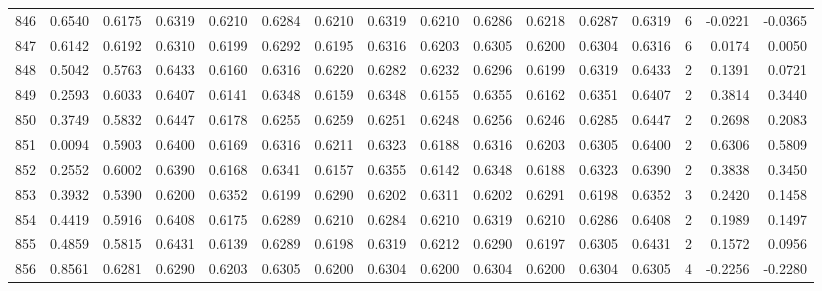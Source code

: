 \begin{tabular}{lrrrrrrrrrrrrrrr}
846 &      0.6540 &  0.6175 &  0.6319 &  0.6210 &  0.6284 &  0.6210 &  0.6319 &  0.6210 &  0.6286 &  0.6218 &   0.6287 &     0.6319 &      6 &                   -0.0221 &                    -0.0365 \\
847 &      0.6142 &  0.6192 &  0.6310 &  0.6199 &  0.6292 &  0.6195 &  0.6316 &  0.6203 &  0.6305 &  0.6200 &   0.6304 &     0.6316 &      6 &                    0.0174 &                     0.0050 \\
848 &      0.5042 &  0.5763 &  0.6433 &  0.6160 &  0.6316 &  0.6220 &  0.6282 &  0.6232 &  0.6296 &  0.6199 &   0.6319 &     0.6433 &      2 &                    0.1391 &                     0.0721 \\
849 &      0.2593 &  0.6033 &  0.6407 &  0.6141 &  0.6348 &  0.6159 &  0.6348 &  0.6155 &  0.6355 &  0.6162 &   0.6351 &     0.6407 &      2 &                    0.3814 &                     0.3440 \\
850 &      0.3749 &  0.5832 &  0.6447 &  0.6178 &  0.6255 &  0.6259 &  0.6251 &  0.6248 &  0.6256 &  0.6246 &   0.6285 &     0.6447 &      2 &                    0.2698 &                     0.2083 \\
851 &      0.0094 &  0.5903 &  0.6400 &  0.6169 &  0.6316 &  0.6211 &  0.6323 &  0.6188 &  0.6316 &  0.6203 &   0.6305 &     0.6400 &      2 &                    0.6306 &                     0.5809 \\
852 &      0.2552 &  0.6002 &  0.6390 &  0.6168 &  0.6341 &  0.6157 &  0.6355 &  0.6142 &  0.6348 &  0.6188 &   0.6323 &     0.6390 &      2 &                    0.3838 &                     0.3450 \\
853 &      0.3932 &  0.5390 &  0.6200 &  0.6352 &  0.6199 &  0.6290 &  0.6202 &  0.6311 &  0.6202 &  0.6291 &   0.6198 &     0.6352 &      3 &                    0.2420 &                     0.1458 \\
854 &      0.4419 &  0.5916 &  0.6408 &  0.6175 &  0.6289 &  0.6210 &  0.6284 &  0.6210 &  0.6319 &  0.6210 &   0.6286 &     0.6408 &      2 &                    0.1989 &                     0.1497 \\
855 &      0.4859 &  0.5815 &  0.6431 &  0.6139 &  0.6289 &  0.6198 &  0.6319 &  0.6212 &  0.6290 &  0.6197 &   0.6305 &     0.6431 &      2 &                    0.1572 &                     0.0956 \\
856 &      0.8561 &  0.6281 &  0.6290 &  0.6203 &  0.6305 &  0.6200 &  0.6304 &  0.6200 &  0.6304 &  0.6200 &   0.6304 &     0.6305 &      4 &                   -0.2256 &                    -0.2280 \\

\end{tabular}
